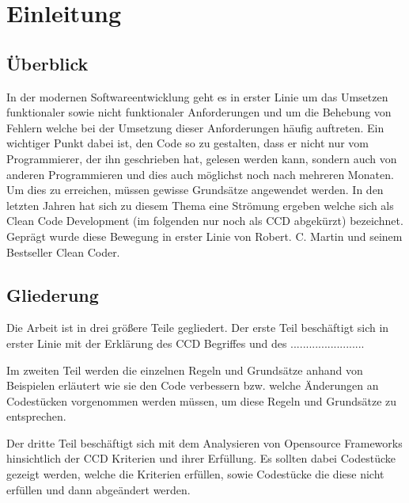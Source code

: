 \chapter{Einleitung}
\label{cha:Einleitung}

\section{Überblick}
In der modernen Softwareentwicklung geht es in erster
Linie um das Umsetzen funktionaler sowie nicht funktionaler
Anforderungen und um die Behebung von Fehlern welche bei der Umsetzung dieser Anforderungen häufig auftreten. Ein wichtiger Punkt dabei ist, den Code so zu gestalten, dass er nicht nur vom Programmierer, der ihn geschrieben hat, gelesen werden kann, sondern auch von anderen Programmieren und dies auch möglichst noch nach mehreren Monaten. Um dies zu erreichen, müssen gewisse Grundsätze angewendet werden. In den letzten Jahren hat sich zu diesem Thema eine Strömung ergeben welche sich als Clean Code Development (im folgenden nur noch als CCD abgekürzt) bezeichnet. Geprägt wurde diese Bewegung in erster Linie von Robert. C. Martin und seinem Bestseller Clean Coder. 

\section{Gliederung}
Die Arbeit ist in drei größere Teile gegliedert. Der erste Teil beschäftigt sich in erster Linie mit der Erklärung des CCD Begriffes und des ........................ 

\SuperPar Im zweiten Teil werden die einzelnen Regeln und Grundsätze anhand von Beispielen erläutert wie sie den Code verbessern bzw. welche Änderungen an Codestücken vorgenommen werden müssen, um diese Regeln und Grundsätze zu entsprechen.

\SuperPar 
Der dritte Teil beschäftigt sich mit dem Analysieren von Opensource Frameworks hinsichtlich der CCD Kriterien und ihrer Erfüllung. Es sollten dabei Codestücke gezeigt werden, welche die Kriterien erfüllen, sowie Codestücke die diese nicht erfüllen und dann abgeändert werden. 

